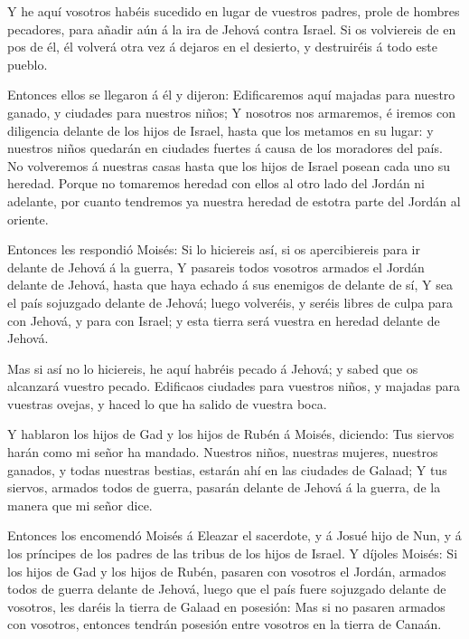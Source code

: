  Y he aquí vosotros habéis sucedido en lugar de vuestros
padres, prole de hombres pecadores, para añadir aún á la ira de Jehová
contra Israel.  Si os volviereis de en pos de él, él
volverá otra vez á dejaros en el desierto, y destruiréis á todo este
pueblo.

 Entonces ellos se llegaron á él y dijeron: Edificaremos
aquí majadas para nuestro ganado, y ciudades para nuestros niños;
 Y nosotros nos armaremos, é iremos con diligencia delante
de los hijos de Israel, hasta que los metamos en su lugar: y nuestros
niños quedarán en ciudades fuertes á causa de los moradores del país.
 No volveremos á nuestras casas hasta que los hijos de
Israel posean cada uno su heredad.  Porque no tomaremos
heredad con ellos al otro lado del Jordán ni adelante, por cuanto
tendremos ya nuestra heredad de estotra parte del Jordán al oriente.

 Entonces les respondió Moisés: Si lo hiciereis así, si os
apercibiereis para ir delante de Jehová á la guerra,  Y
pasareis todos vosotros armados el Jordán delante de Jehová, hasta que
haya echado á sus enemigos de delante de sí,  Y sea el país
sojuzgado delante de Jehová; luego volveréis, y seréis libres de culpa
para con Jehová, y para con Israel; y esta tierra será vuestra en
heredad delante de Jehová.

 Mas si así no lo hiciereis, he aquí habréis pecado á
Jehová; y sabed que os alcanzará vuestro pecado.  Edificaos
ciudades para vuestros niños, y majadas para vuestras ovejas, y haced lo
que ha salido de vuestra boca.

 Y hablaron los hijos de Gad y los hijos de Rubén á Moisés,
diciendo: Tus siervos harán como mi señor ha mandado. 
Nuestros niños, nuestras mujeres, nuestros ganados, y todas nuestras
bestias, estarán ahí en las ciudades de Galaad;  Y tus
siervos, armados todos de guerra, pasarán delante de Jehová á la guerra,
de la manera que mi señor dice.

 Entonces los encomendó Moisés á Eleazar el sacerdote, y á
Josué hijo de Nun, y á los príncipes de los padres de las tribus de los
hijos de Israel.  Y díjoles Moisés: Si los hijos de Gad y
los hijos de Rubén, pasaren con vosotros el Jordán, armados todos de
guerra delante de Jehová, luego que el país fuere sojuzgado delante de
vosotros, les daréis la tierra de Galaad en posesión:  Mas
si no pasaren armados con vosotros, entonces tendrán posesión entre
vosotros en la tierra de Canaán.

